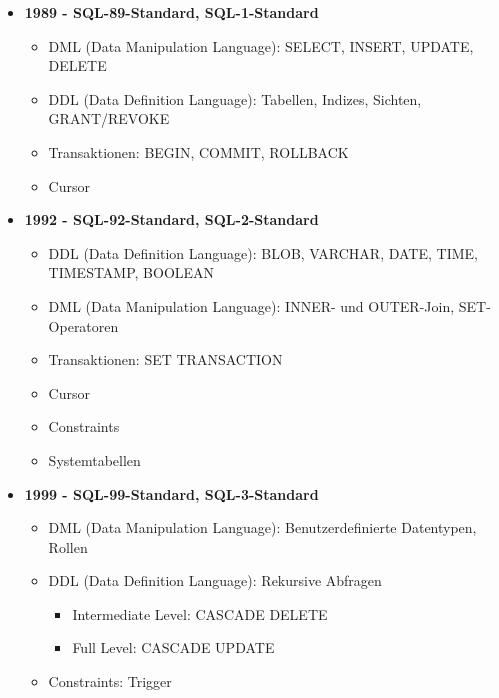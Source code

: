       \begin{itemize}
        \item \textbf{1989 - SQL-89-Standard, SQL-1-Standard}
          \begin{small}
            \begin{itemize}
              \item DML (Data Manipulation Language): SELECT, INSERT, UPDATE, DELETE
              \item DDL (Data Definition Language): Tabellen, Indizes, Sichten, GRANT/REVOKE
              \item Transaktionen: BEGIN, COMMIT, ROLLBACK
              \item Cursor
            \end{itemize}
          \end{small}
        \item \textbf{1992 - SQL-92-Standard, SQL-2-Standard}
          \begin{small}
            \begin{itemize}
              \item DDL (Data Definition Language): BLOB, VARCHAR, DATE, TIME, TIMESTAMP, BOOLEAN
              \item DML (Data Manipulation Language): INNER- und OUTER-Join, SET-Operatoren
              \item Transaktionen: SET TRANSACTION
              \item Cursor
              \item Constraints
              \item Systemtabellen
            \end{itemize}
          \end{small}
        \item \textbf{1999 - SQL-99-Standard, SQL-3-Standard}
          \begin{small}
            \begin{itemize}
              \item DML (Data Manipulation Language): Benutzerdefinierte Datentypen, Rollen
              \item DDL (Data Definition Language): Rekursive Abfragen
                \begin{itemize}
                  \item Intermediate Level: CASCADE DELETE
                  \item Full Level: CASCADE UPDATE
                \end{itemize}
              \item Constraints: Trigger

\end{itemize}
\end{small}
\end{itemize}

